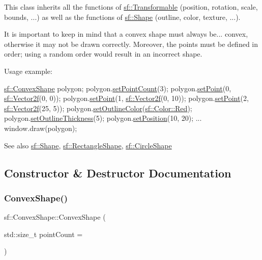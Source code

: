 This class inherits all the functions of \hyperlink{classsf_1_1_transformable}{sf\+::\+Transformable} (position, rotation, scale, bounds, ...) as well as the functions of \hyperlink{classsf_1_1_shape}{sf\+::\+Shape} (outline, color, texture, ...).

It is important to keep in mind that a convex shape must always be... convex, otherwise it may not be drawn correctly. Moreover, the points must be defined in order; using a random order would result in an incorrect shape.

Usage example\+: 
\begin{DoxyCode}
\hyperlink{classsf_1_1_convex_shape}{sf::ConvexShape} polygon;
polygon.\hyperlink{classsf_1_1_convex_shape_a56e6e79ade6dd651cc1a0e39cb68deae}{setPointCount}(3);
polygon.\hyperlink{classsf_1_1_convex_shape_a5929e0ab0ba5ca1f102b40c234a8e92d}{setPoint}(0, \hyperlink{classsf_1_1_vector2}{sf::Vector2f}(0, 0));
polygon.\hyperlink{classsf_1_1_convex_shape_a5929e0ab0ba5ca1f102b40c234a8e92d}{setPoint}(1, \hyperlink{classsf_1_1_vector2}{sf::Vector2f}(0, 10));
polygon.\hyperlink{classsf_1_1_convex_shape_a5929e0ab0ba5ca1f102b40c234a8e92d}{setPoint}(2, \hyperlink{classsf_1_1_vector2}{sf::Vector2f}(25, 5));
polygon.\hyperlink{classsf_1_1_shape_a5978f41ee349ac3c52942996dcb184f7}{setOutlineColor}(\hyperlink{classsf_1_1_color_a127dbf55db9c07d0fa8f4bfcbb97594a}{sf::Color::Red});
polygon.\hyperlink{classsf_1_1_shape_a5ad336ad74fc1f567fce3b7e44cf87dc}{setOutlineThickness}(5);
polygon.\hyperlink{classsf_1_1_transformable_a4dbfb1a7c80688b0b4c477d706550208}{setPosition}(10, 20);
...
window.draw(polygon);
\end{DoxyCode}


\begin{DoxySeeAlso}{See also}
\hyperlink{classsf_1_1_shape}{sf\+::\+Shape}, \hyperlink{classsf_1_1_rectangle_shape}{sf\+::\+Rectangle\+Shape}, \hyperlink{classsf_1_1_circle_shape}{sf\+::\+Circle\+Shape} 
\end{DoxySeeAlso}


\subsection{Constructor \& Destructor Documentation}
\mbox{\label{classsf_1_1_convex_shape_af9981b8909569b381b3fccf32fc69856}} 
\subsubsection{\texorpdfstring{Convex\+Shape()}{ConvexShape()}}
{\footnotesize\ttfamily sf\+::\+Convex\+Shape\+::\+Convex\+Shape (\begin{DoxyParamCaption}\item[{std\+::size\+\_\+t}]{point\+Count = {} }\end{DoxyParamCaption})\hspace{0.3cm}{\ttfamily [explicit]}}



